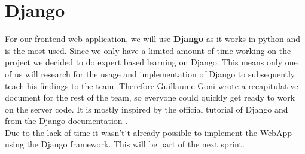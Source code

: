 
\section{Django}\label{sec:django}

For our frontend web application, we will use \textbf{Django} as it works in python and is the most used.
Since we only have a limited amount of time working on the project we decided to do expert based learning on Django. This means only one of us will research for the usage and implementation of Django to subsequently teach his findings to the team. 
Therefore Guillaume Goni wrote a recapitulative document for the rest of the team, so everyone could quickly get ready to work on the server code.
It is mostly inspired by the official tutorial of Django \citep{Djangodocumentation2019} and from the Django documentation \citep{Django2019}.\\
Due to the lack of time it wasn't`t already possible to implement the WebApp using the Django framework. This will be part of the next sprint.
